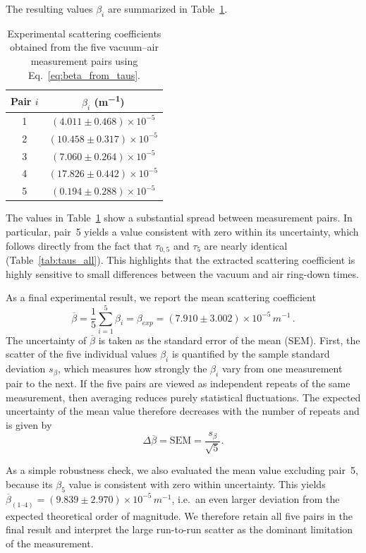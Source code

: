 \documentclass[a4paper]{article}
\begin{document}
The resulting values $\beta_i$ are summarized in Table~\ref{tab:beta_all}.

\vspace{1em}
\begin{table}[H]
\centering
\caption{Experimental scattering coefficients obtained from the five vacuum--air measurement pairs using Eq.~\eqref{eq:beta_from_taus}.}
\label{tab:beta_all}
\begin{tabular}{c c}
\toprule
Pair $i$ & $\beta_i$ (\si{m^{-1}}) \\
\midrule
1 & $(4.011 \pm 0.468)\times 10^{-5}$ \\
2 & $(10.458 \pm 0.317)\times 10^{-5}$ \\
3 & $(7.060 \pm 0.264)\times 10^{-5}$ \\
4 & $(17.826 \pm 0.442)\times 10^{-5}$ \\
5 & $(0.194 \pm 0.288)\times 10^{-5}$ \\
\bottomrule
\end{tabular}
\end{table}

\newpage
The values in Table~\ref{tab:beta_all} show a substantial spread between measurement pairs.
In particular, pair~5 yields a value consistent with zero within its uncertainty, which follows directly from the fact that $\tau_{0,5}$ and $\tau_{5}$ are nearly identical (Table~\ref{tab:taus_all}).
This highlights that the extracted scattering coefficient is highly sensitive to small differences between the vacuum and air ring-down times.

As a final experimental result, we report the mean scattering coefficient
\begin{equation}
\overline{\beta} = \frac{1}{5}\sum_{i=1}^{5}\beta_i = \boxed{\beta_{exp} = (7.910\pm 3.002)\times 10^{-5}\,\si{m^{-1}}} \, .
\label{eq:beta_exp}
\end{equation}
The uncertainty of $\overline{\beta}$ is taken as the standard error of the mean (SEM).
First, the scatter of the five individual values $\beta_i$ is quantified by the sample standard deviation $s_{\beta}$, which measures how strongly the $\beta_i$ vary from one measurement pair to the next.
If the five pairs are viewed as independent repeats of the same measurement, then averaging reduces purely statistical fluctuations.
The expected uncertainty of the mean value therefore decreases with the number of repeats and is given by
\[
\Delta\overline{\beta}=\mathrm{SEM}=\frac{s_{\beta}}{\sqrt{5}}.
\]

As a simple robustness check, we also evaluated the mean value excluding pair~5, because its $\beta_5$ value is consistent with zero within uncertainty.
This yields $\overline{\beta}_{(1\text{--}4)}=(9.839\pm 2.970)\times 10^{-5}\,\si{m^{-1}}$, i.e.\ an even larger deviation from the expected theoretical order of magnitude.
We therefore retain all five pairs in the final result and interpret the large run-to-run scatter as the dominant limitation of the measurement.
\end{document}
